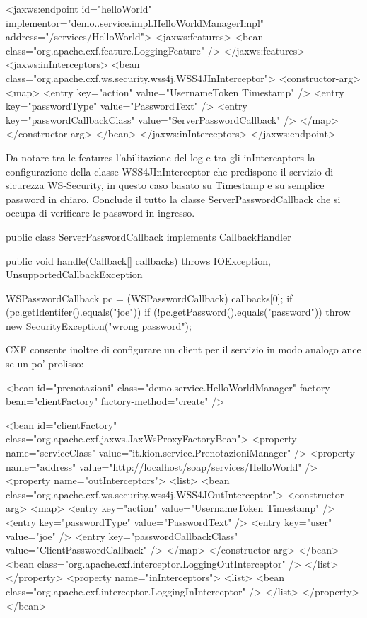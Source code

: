 \begin{xml}
<jaxws:endpoint id="helloWorld"
  implementor="demo..service.impl.HelloWorldManagerImpl" address="/services/HelloWorld">
   <jaxws:features>
     <bean class="org.apache.cxf.feature.LoggingFeature" />
   </jaxws:features>
   <jaxws:inInterceptors>
   <bean class="org.apache.cxf.ws.security.wss4j.WSS4JInInterceptor">
  <constructor-arg>
    <map>
      <entry key="action" value="UsernameToken Timestamp" />
      <entry key="passwordType" value="PasswordText" />
      <entry key="passwordCallbackClass" value="ServerPasswordCallback" />
   </map>
      </constructor-arg>
    </bean>
   </jaxws:inInterceptors>
</jaxws:endpoint>
\end{xml}

Da notare  tra le features l'abilitazione del log e tra gli inIntercaptors la configurazione della classe  WSS4JInInterceptor che predispone il servizio di sicurezza WS-Security, in questo caso basato su Timestamp e su semplice password in chiaro. Conclude il tutto la classe  ServerPasswordCallback che si occupa di verificare le password in ingresso.

\begin{java}
public class ServerPasswordCallback implements CallbackHandler {

  public void handle(Callback[] callbacks) throws IOException,
     UnsupportedCallbackException {
    
  WSPasswordCallback pc = (WSPasswordCallback) callbacks[0];
  if (pc.getIdentifer().equals("joe")) {
  if (!pc.getPassword().equals("password")) {
      throw new SecurityException("wrong password");
    }
  }
  } 
}
\end{java}

CXF consente inoltre di configurare un client per il servizio in modo analogo ance se un po' prolisso:

\begin{xml}
<bean id="prenotazioni" class="demo.service.HelloWorldManager"
  factory-bean="clientFactory" factory-method="create" />
  
<bean id="clientFactory" class="org.apache.cxf.jaxws.JaxWsProxyFactoryBean">
  <property name="serviceClass" value="it.kion.service.PrenotazioniManager" />
  <property name="address" value="http://localhost/soap/services/HelloWorld" />
  <property name="outInterceptors">
   <list>
    <bean class="org.apache.cxf.ws.security.wss4j.WSS4JOutInterceptor">
     <constructor-arg>
      <map>
    <entry key="action" value="UsernameToken Timestamp" />
    <entry key="passwordType" value="PasswordText" />
    <entry key="user" value="joe" />
        <entry key="passwordCallbackClass" value="ClientPasswordCallback" />
  </map>
     </constructor-arg>
    </bean>
    <bean class="org.apache.cxf.interceptor.LoggingOutInterceptor" />
   </list>
  </property>
  <property name="inInterceptors">
   <list>
    <bean class="org.apache.cxf.interceptor.LoggingInInterceptor" />
   </list>
  </property>
</bean>
\end{xml}


